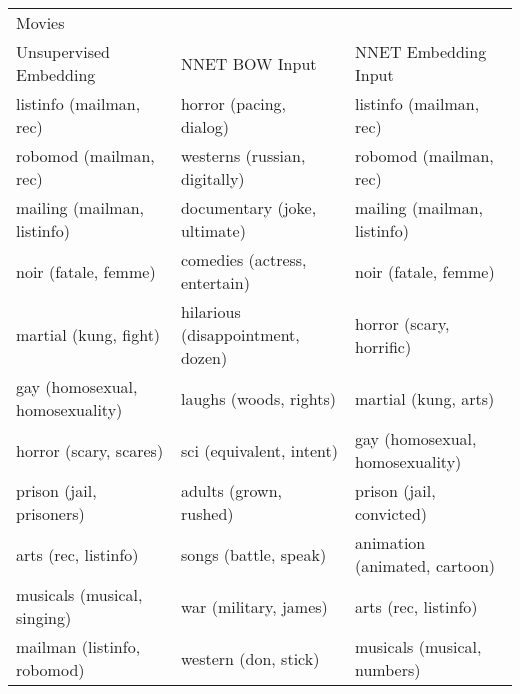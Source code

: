 \begin{table}[]
	\scriptsize
	\begin{tabular}{lll}
		Movies                                   &                                                   &                                                          \\
		Unsupervised Embedding                                  & NNET BOW Input                                       & NNET Embedding Input                                             \\
		listinfo (mailman, rec)                  & horror (pacing, dialog)                           & listinfo (mailman, rec)                                  \\
		robomod (mailman, rec)                   & westerns (russian, digitally)                     & robomod (mailman, rec)                                   \\
		mailing (mailman, listinfo)              & documentary (joke, ultimate)                      & mailing (mailman, listinfo)                              \\
		noir (fatale, femme)                     & comedies (actress, entertain)                     & noir (fatale, femme)                                     \\
		martial (kung, fight)                    & hilarious (disappointment, dozen)                 & horror (scary, horrific)                                 \\
		gay (homosexual, homosexuality)          & laughs (woods, rights)                            & martial (kung, arts)                                     \\
		horror (scary, scares)                   & sci (equivalent, intent)                          & gay (homosexual, homosexuality)                          \\
		prison (jail, prisoners)                 & adults (grown, rushed)                            & prison (jail, convicted)                                 \\
		arts (rec, listinfo)                     & songs (battle, speak)                             & animation (animated, cartoon)                            \\
		musicals (musical, singing)              & war (military, james)                             & arts (rec, listinfo)                                     \\
		mailman (listinfo, robomod)              & western (don, stick)                              & musicals (musical, numbers)                              \\

\end{tabular}
\end{table}
